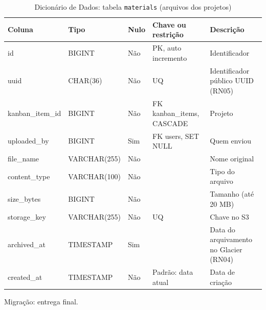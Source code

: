 \begin{table}[H]
\centering
\footnotesize
\caption{Dicionário de Dados: tabela \texttt{materials} (arquivos dos projetos)}
\label{tab:dd-materials}
\begin{tabular}{|>{\raggedright\arraybackslash}p{3.0cm}|>{\raggedright\arraybackslash}p{3.2cm}|>{\centering\arraybackslash}p{0.8cm}|>{\raggedright\arraybackslash}p{3.0cm}|>{\raggedright\arraybackslash}p{3.8cm}|}
\hline
\textbf{Coluna} & \textbf{Tipo} & \textbf{Nulo} & \textbf{Chave ou restrição} & \textbf{Descrição} \\
\hline
id & BIGINT & Não & PK, auto incremento & Identificador \\
\hline
uuid & CHAR(36) & Não & UQ & Identificador público UUID (RN05) \\
\hline
kanban\_\allowbreak{}item\_\allowbreak{}id & BIGINT & Não & FK kanban\_\allowbreak{}items, CASCADE & Projeto \\
\hline
uploaded\_\allowbreak{}by & BIGINT & Sim & FK users, SET NULL & Quem enviou \\
\hline
file\_\allowbreak{}name & VARCHAR(255) & Não &  & Nome original \\
\hline
content\_\allowbreak{}type & VARCHAR(100) & Não &  & Tipo do arquivo \\
\hline
size\_\allowbreak{}bytes & BIGINT & Não &  & Tamanho (até 20 MB) \\
\hline
storage\_\allowbreak{}key & VARCHAR(255) & Não & UQ & Chave no S3 \\
\hline
archived\_\allowbreak{}at & TIMESTAMP & Sim &  & Data do arquivamento no Glacier (RN04) \\
\hline
created\_\allowbreak{}at & TIMESTAMP & Não & Padrão: data atual & Data de criação \\
\hline
\end{tabular}
\par\footnotesize Migração: entrega final.
\end{table}


